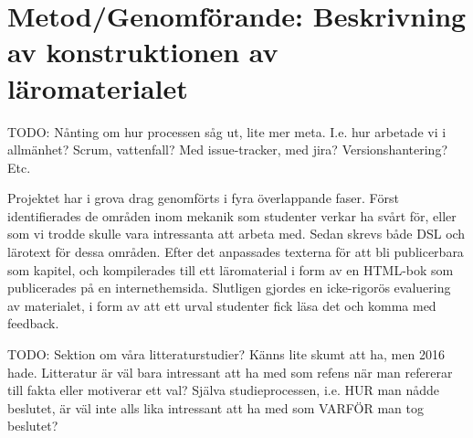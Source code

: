 



\chapter{Metod/Genomförande: Beskrivning av konstruktionen av läromaterialet}

%

TODO: Nånting om hur processen såg ut, lite mer meta. I.e. hur
arbetade vi i allmänhet? Scrum, vattenfall? Med issue-tracker, med
jira? Versionshantering? Etc.

\begin{draft}

  Projektet har i grova drag genomförts i fyra överlappande
  faser. Först identifierades de områden inom mekanik som studenter
  verkar ha svårt för, eller som vi trodde skulle vara intressanta att
  arbeta med. Sedan skrevs både DSL och lärotext för dessa
  områden. Efter det anpassades texterna för att bli publicerbara som
  kapitel, och kompilerades till ett läromaterial i form av en
  HTML-bok som publicerades på en internethemsida. Slutligen gjordes
  en icke-rigorös evaluering av materialet, i form av att ett urval
  studenter fick läsa det och komma med feedback.

\end{draft}

TODO: Sektion om våra litteraturstudier? Känns lite skumt att ha,
men 2016 hade. Litteratur är väl bara intressant att ha med som
refens när man refererar till fakta eller motiverar ett val? Själva
studieprocessen, i.e. HUR man nådde beslutet, är väl inte alls lika
intressant att ha med som VARFÖR man tog beslutet?

